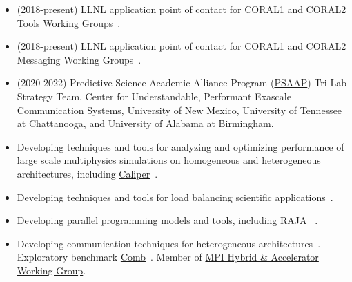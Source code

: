 {\begin{itemize}
		    - Callflow, multi-view performance visualization tool.
		\item (2018-present) LLNL application point of contact for CORAL1 and CORAL2 Tools Working Groups~\cite{pearce:Coral2Mar20}.
		\item (2018-present) LLNL application point of contact for CORAL1 and CORAL2 Messaging Working Groups~\cite{pearce:sc19,pearce:ibm19,pearce:summitApr20,pearce:summitDec19,pearce:summitAug19}.
		\item (2020-2022) Predictive Science Academic Alliance Program (\href{https://psaap.llnl.gov}{PSAAP}) Tri-Lab Strategy Team, 
			Center for Understandable, Performant Exascale Communication Systems, University of New Mexico, 
			University of Tennessee at Chattanooga, and University of Alabama at Birmingham.
		\item Developing techniques and tools for analyzing and optimizing performance of large scale multiphysics simulations on homogeneous and heterogeneous architectures,
          including \href{https://software.llnl.gov/Caliper/index.html}{Caliper}~\cite{boehme:sc16,pearce:salishan19,pearce:cascWIP19,pearce:necdc18,pearce:gtc18,pearce:jowog18}.
		\item Developing techniques and tools for load balancing scientific applications~\cite{pearce:fgcs18,pearce:sc16pmbs}.
		\item Developing parallel programming models and tools, including \href{https://raja.readthedocs.io/en/main/}{RAJA}
          ~\cite{beckingsale:ipdps17,pearce:p3hpc19,pearce:pc19,pearce:p2s218,pearce:gtc19,pearce:jowog19,pearce:coepp17,trilabL2:15}.
		\item Developing communication techniques for heterogeneous architectures~\cite{pearce:parco20}.
          Exploratory benchmark \href{https://github.com/LLNL/Comb}{Comb}~\cite{pearce:summitApr20,pearce:summitDec19,pearce:summitAug19}.
          Member of \href{https://github.com/mpiwg-hybrid/hybrid-issues}{MPI Hybrid \& Accelerator Working Group}.
		\end{itemize}}

